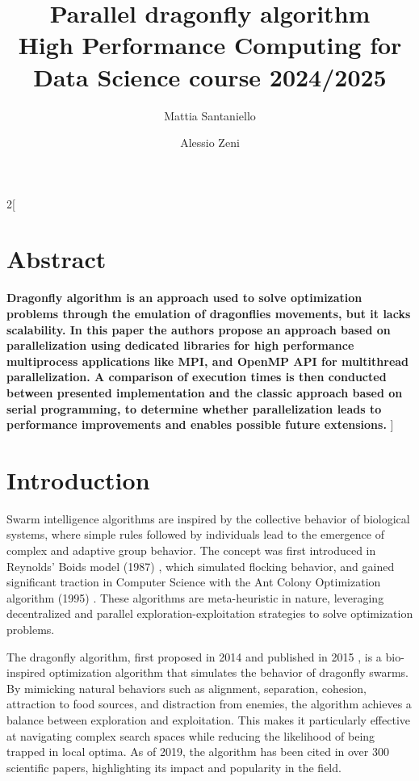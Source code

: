 \documentclass[10pt]{article}
\title{\textbf{Parallel dragonfly algorithm} %
  \\[2ex] \large High Performance Computing for Data Science course 2024/2025}
\author[1]{Mattia Santaniello}
\author[2]{Alessio Zeni}
\affil{University of Trento}
\begin{document}
\maketitle

\begin{multicols}{2}[
  \fontsize{9}{9}
  \section*{Abstract}
  \textbf{
    Dragonfly algorithm is an approach used to solve optimization problems through the emulation of dragonflies movements, but it lacks scalability.
  In this paper the authors propose an approach based on parallelization using dedicated libraries for high performance multiprocess applications like MPI, and OpenMP API for multithread parallelization.
  A comparison of execution times is then conducted between presented implementation and the classic approach based on serial programming,
  to determine whether parallelization leads to performance improvements and enables possible future extensions.
  }\newline]

\section{Introduction}
Swarm intelligence algorithms are inspired by the collective behavior of biological systems, where simple rules followed by individuals lead to the emergence of complex and adaptive group behavior. The concept was first introduced in Reynolds' Boids model (1987) \cite{TODO}, which simulated flocking behavior, and gained significant traction in Computer Science with the Ant Colony Optimization algorithm (1995) \cite{TODO}.
These algorithms are meta-heuristic in nature, leveraging decentralized and parallel exploration-exploitation strategies to solve optimization problems.

The dragonfly algorithm, first proposed in 2014 and published in 2015 \cite{DAReview}, is a bio-inspired optimization algorithm that simulates the behavior of dragonfly swarms.
By mimicking natural behaviors such as alignment, separation, cohesion, attraction to food sources, and distraction from enemies, the algorithm achieves a balance between exploration and exploitation.
This makes it particularly effective at navigating complex search spaces while reducing the likelihood of being trapped in local optima.
As of 2019, the algorithm has been cited in over 300 scientific papers, highlighting its impact and popularity in the field.


\end{multicols}
\end{document}
